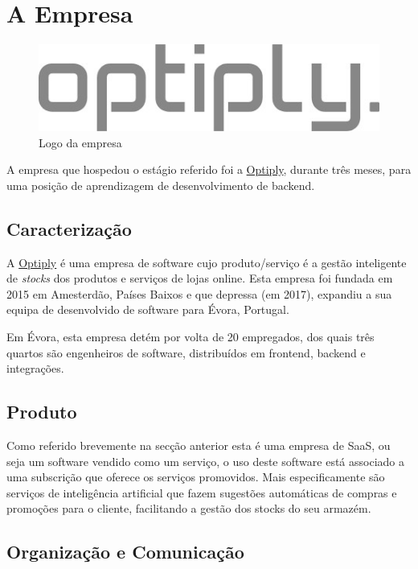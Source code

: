 \chapter{A Empresa}\label{cap2}

\begin{figure}[!hbt]
  \centering
  \includegraphics[width=12cm]{figuras/optiply_logo.jpg}
  \caption{Logo da empresa}
  \label{fig:logo}
\end{figure}
\FloatBarrier

A empresa que hospedou o estágio referido foi a \href{https://optiply.nl/}{Optiply}, durante três meses, para uma posição de aprendizagem de desenvolvimento de backend.

\section{Caracterização}

A \href{https://optiply.nl/}{Optiply} é uma empresa de software cujo produto/serviço é a gestão inteligente de \textit{stocks} dos produtos e serviços de lojas online. \cite{optiply} Esta empresa foi fundada em 2015 em Amesterdão, Países Baixos e que depressa (em 2017), expandiu a sua equipa de desenvolvido de software para Évora, Portugal.

Em Évora, esta empresa detém por volta de 20 empregados, dos quais três quartos são engenheiros de software, distribuídos em frontend, backend e integrações.

\section{Produto}

Como referido brevemente na secção anterior esta é uma empresa de SaaS, ou seja um software vendido como um serviço, o uso deste software está associado a uma subscrição que oferece os serviços promovidos. Mais especificamente são serviços de inteligência artificial que fazem sugestões automáticas de compras e promoções para o cliente, facilitando a gestão dos stocks do seu armazém.

\newpage

\section{Organização e Comunicação}

